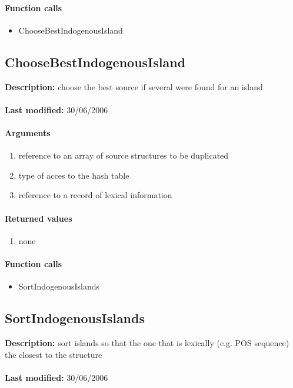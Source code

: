 \paragraph{Function calls}
\begin{itemize}
\item ChooseBestIndogenousIsland
\end{itemize}

\subsection{ChooseBestIndogenousIsland}
\textbf{Description:} choose the best source if several were found for an island\\
\\\textbf{Last modified:} 30/06/2006

\paragraph{Arguments}
\begin{enumerate}
\item reference to an array of source structures to be duplicated
\item type of acces to the hash table
\item reference to a record of lexical information
\end{enumerate}

\paragraph{Returned values}
\begin{enumerate}
\item none
\end{enumerate}

\paragraph{Function calls}
\begin{itemize}
\item SortIndogenousIslands
\end{itemize}

\subsection{SortIndogenousIslands}
\textbf{Description:} sort islands so that the one that is lexically (e.g. POS sequence) the closest to the structure\\
\\\textbf{Last modified:} 30/06/2006

